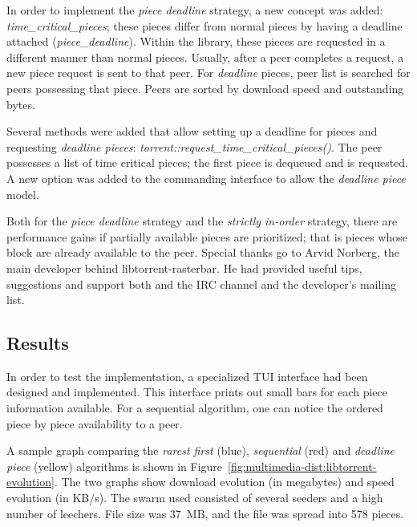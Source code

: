 In order to implement the \textit{piece deadline} strategy, a new concept was
added: \textit{time\_critical\_pieces}; these pieces differ from normal pieces
by having a deadline attached (\textit{piece\_deadline}). Within the library,
these pieces are requested in a different manner than normal pieces. Usually,
after a peer completes a request, a new piece request is sent to that peer.
For \textit{deadline} pieces, peer list is searched for peers possessing that
piece. Peers are sorted by download speed and outstanding bytes.

Several methods were added that allow setting up a deadline for pieces and
requesting \textit{deadline pieces}:
\textit{torrent::request\_time\_critical\_pieces()}. The peer possesses a list
of time critical pieces; the first piece is dequeued and is requested. A new
option was added to the commanding interface to allow the \textit{deadline
piece} model.

Both for the \textit{piece deadline} strategy and the \textit{strictly
in-order} strategy, there are performance gains if partially available pieces
are prioritized; that is pieces whose block are already available to the peer.
Special thanks go to Arvid Norberg, the main developer behind
libtorrent-rasterbar. He had provided useful tips, suggestions and support
both and the IRC channel and the developer's mailing list.

\subsection{Results}
\label{subsec:multimedia-dist:libtorrent-results}

In order to test the implementation, a specialized TUI interface had been
designed and implemented. This interface prints out small bars for each piece
information available. For a sequential algorithm, one can notice the ordered
piece by piece availability to a peer.

A sample graph comparing the \textit{rarest first} (blue), \textit{sequential}
(red) and \textit{deadline piece} (yellow) algorithms is shown in
Figure~\ref{fig:multimedia-dist:libtorrent-evolution}. The two
graphs show download evolution (in megabytes) and speed evolution (in KB/s).
The swarm used consisted of several seeders and a high number of leechers.
File size was 37~MB, and the file was spread into 578 pieces.

